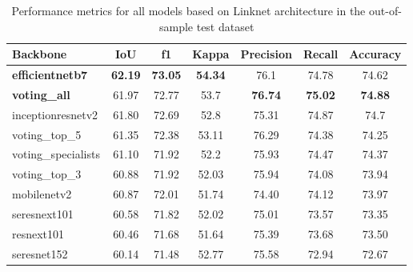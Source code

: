 \begin{table}[H]
    \centering
    \caption[Performance of all models based on Linknet
        architecture in the out-of-sample test dataset]{Performance metrics for
        all
        models based on Linknet
        architecture in the out-of-sample test dataset}
    \label{tab:metrics-test}
    \begin{tabular}{lcccccc}
        \toprule
        Backbone                & IoU            & f1             & Kappa
                                & Precision      & Recall         &
        Accuracy
        \\
        \midrule
        \textbf{efficientnetb7} & \textbf{62.19} & \textbf{73.05} &
        \textbf{54.34}          & 76.1           & 74.78          & 74.62
        \\
        \textbf{voting\_all}    & 61.97          & 72.77          & 53.7
                                & \textbf{76.74} & \textbf{75.02} &
        \textbf{74.88}                                                    \\
        inceptionresnetv2       & 61.80          & 72.69          & 52.8
                                & 75.31          & 74.87          & 74.7
        \\
        voting\_top\_5          & 61.35          & 72.38          & 53.11
                                & 76.29          & 74.38          & 74.25
        \\
        voting\_specialists     & 61.10          & 71.92          & 52.2
                                & 75.93          & 74.47          &
        74.37
        \\
        voting\_top\_3          & 60.88          & 71.92          & 52.03
                                & 75.94          & 74.08          & 73.94
        \\
        mobilenetv2             & 60.87          & 72.01          & 51.74
                                & 74.40          & 74.12          & 73.97
        \\
        seresnext101            & 60.58          & 71.82          & 52.02
                                & 75.01          & 73.57          & 73.35
        \\
        resnext101              & 60.46          & 71.68          & 51.64
                                & 75.39          & 73.68          & 73.50
        \\
        seresnet152             & 60.14          & 71.48          & 52.77
                                & 75.58          & 72.94          & 72.67

\end{tabular}
\end{table}
